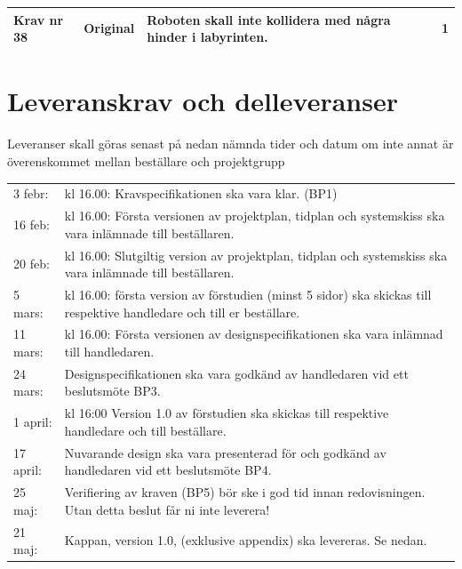 \documentclass[11pt]{article}
\begin{document}
\begin{flushleft}
\begin{center}
\begin{longtable}{|l|l|p{.70\linewidth}|l|}
Krav nr 38 &
Original &
Roboten skall inte kollidera med några hinder i labyrinten. &
1 \\ \hline

\end{longtable}
\end{center}

\pagebreak
\section{Leveranskrav och delleveranser}
Leveranser skall göras senast på nedan nämnda tider och datum om inte annat är överenskommet mellan beställare och projektgrupp
\begin{center}
\begin{longtable}{l p{.8\linewidth} }

3 febr: & 
kl 16.00: Kravspecifikationen ska vara klar. (BP1) \\

16 feb: & 
kl 16.00: Första versionen av projektplan, tidplan och systemskiss ska vara inlämnade till beställaren. \\

20 feb: & 
kl 16.00: Slutgiltig version av projektplan, tidplan och systemskiss ska vara inlämnade till beställaren. \\

5 mars: &
kl 16.00: första version av förstudien (minst 5 sidor) ska skickas till respektive handledare och till er beställare. \\

11 mars: & 
kl 16.00: Första versionen av designspecifikationen ska vara inlämnad till handledaren. \\

24 mars: &
Designspecifikationen ska vara godkänd av handledaren vid ett beslutsmöte BP3. \\

1 april: &
kl 16:00 Version 1.0 av förstudien ska skickas till respektive handledare och till beställare. \\

17 april: & 
Nuvarande design ska vara presenterad för och godkänd av handledaren vid ett beslutsmöte BP4. \\

25 maj: &
Verifiering av kraven (BP5) bör ske i god tid innan redovisningen. Utan detta beslut får ni inte leverera! \\

21 maj: &
Kappan, version 1.0, (exklusive appendix) ska levereras. Se nedan. \\


\end{longtable}
\end{center}
\end{flushleft}
\end{document}
